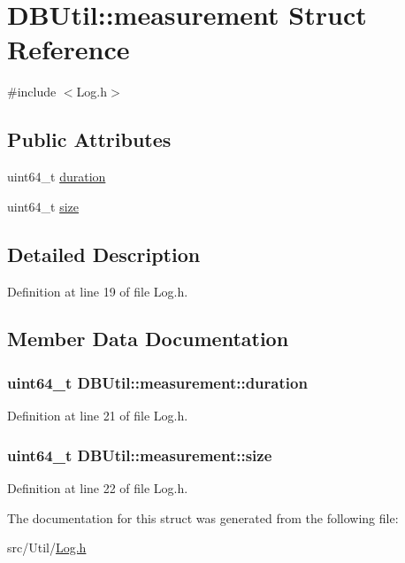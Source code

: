 \hypertarget{struct_d_b_util_1_1measurement}{\section{D\-B\-Util\-:\-:measurement Struct Reference}
\label{struct_d_b_util_1_1measurement}
}


{\ttfamily \#include $<$Log.\-h$>$}

\subsection*{Public Attributes}
\begin{DoxyCompactItemize}
\item 
uint64\-\_\-t \hyperlink{struct_d_b_util_1_1measurement_a91c62eb1fa3de2e3be1a9127c5822b96}{duration}
\item 
uint64\-\_\-t \hyperlink{struct_d_b_util_1_1measurement_aa1de62e639b640d4dadb2fd6d0f95d9e}{size}
\end{DoxyCompactItemize}


\subsection{Detailed Description}


Definition at line 19 of file Log.\-h.



\subsection{Member Data Documentation}
\hypertarget{struct_d_b_util_1_1measurement_a91c62eb1fa3de2e3be1a9127c5822b96}{
\subsubsection[{duration}]{\setlength{\rightskip}{0pt plus 5cm}uint64\-\_\-t D\-B\-Util\-::measurement\-::duration}}\label{struct_d_b_util_1_1measurement_a91c62eb1fa3de2e3be1a9127c5822b96}


Definition at line 21 of file Log.\-h.

\hypertarget{struct_d_b_util_1_1measurement_aa1de62e639b640d4dadb2fd6d0f95d9e}{
\subsubsection[{size}]{\setlength{\rightskip}{0pt plus 5cm}uint64\-\_\-t D\-B\-Util\-::measurement\-::size}}\label{struct_d_b_util_1_1measurement_aa1de62e639b640d4dadb2fd6d0f95d9e}


Definition at line 22 of file Log.\-h.



The documentation for this struct was generated from the following file\-:\begin{DoxyCompactItemize}
\item 
src/\-Util/\hyperlink{_log_8h}{Log.\-h}\end{DoxyCompactItemize}
